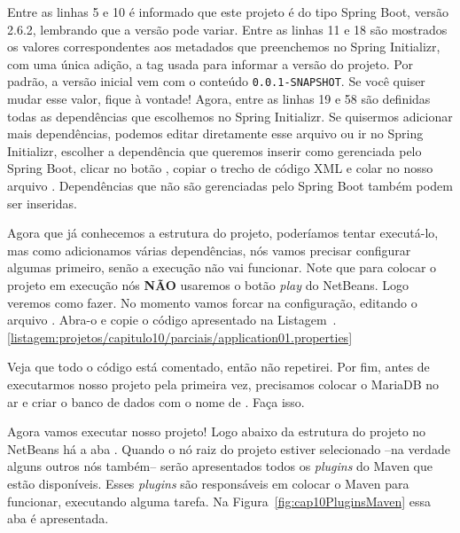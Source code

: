 Entre as linhas 5 e 10 é informado que este projeto é do tipo Spring Boot, versão 2.6.2, lembrando que a versão pode variar. Entre as linhas 11 e 18 são mostrados os valores correspondentes aos metadados que preenchemos no Spring Initializr, com uma única adição, a tag  usada para informar a versão do projeto. Por padrão, a versão inicial vem com o conteúdo \texttt{0.0.1-SNAPSHOT}. Se você quiser mudar esse valor, fique à vontade! Agora, entre as linhas 19 e 58 são definidas todas as dependências que escolhemos no Spring Initializr. Se quisermos adicionar mais dependências, podemos editar diretamente esse arquivo ou ir no Spring Initializr, escolher a dependência que queremos inserir como gerenciada pelo Spring Boot, clicar no botão , copiar o trecho de código XML e colar no nosso arquivo . Dependências que não são gerenciadas pelo Spring Boot também podem ser inseridas.

Agora que já conhecemos a estrutura do projeto, poderíamos tentar executá-lo, mas como adicionamos várias dependências, nós vamos precisar configurar algumas primeiro, senão a execução não vai funcionar. Note que para colocar o projeto em execução nós \textbf{NÃO} usaremos o botão \textit{play} do NetBeans. Logo veremos como fazer. No momento vamos forcar na configuração, editando o arquivo . Abra-o e copie o código apresentado na Listagem~\thechapter.\ref{listagem:projetos/capitulo10/parciais/application01.properties}


Veja que todo o código está comentado, então não repetirei. Por fim, antes de executarmos nosso projeto pela primeira vez, precisamos colocar o MariaDB no ar e criar o banco de dados com o nome de . Faça isso.

Agora vamos executar nosso projeto! Logo abaixo da estrutura do projeto no NetBeans há a aba . Quando o nó raiz do projeto estiver selecionado --na verdade alguns outros nós também-- serão apresentados todos os \textit{plugins} do Maven que estão disponíveis. Esses \textit{plugins} são responsáveis em colocar o Maven para funcionar, executando alguma tarefa. Na Figura~\ref{fig:cap10PluginsMaven} essa aba é apresentada.

